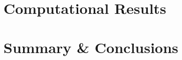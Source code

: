 \documentclass{shervin} %
\begin{document}
\bigskip
\section{Computational Results} \label{sec:Results}

\bigskip
\section{Summary \& Conclusions} \label{sec:Conclusion}







\bigskip

 \label{sec: References}
 




\end{document}
